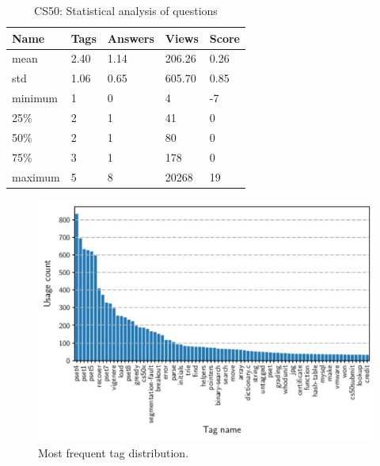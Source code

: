 \documentclass{sig-alternate}
\begin{document}
\begin{table}[]
\caption {CS50: Statistical analysis of questions
}
\hfill \break
\begin{center}
\begin{tabular}{|l|l|l|l|l|}
\hline
\textbf{Name} & \textbf{Tags} & \textbf{Answers} & \textbf{Views} & \textbf{Score} \\ \hline
mean          & 2.40          & 1.14             & 206.26         & 0.26           \\ \hline
std           & 1.06          & 0.65             & 605.70         & 0.85           \\ \hline
minimum       & 1             & 0                & 4              & -7             \\ \hline
25\%          & 2             & 1                & 41             & 0              \\ \hline
50\%          & 2             & 1                & 80             & 0              \\ \hline
75\%          & 3             & 1                & 178            & 0              \\ \hline
maximum       & 5             & 8                & 20268          & 19             \\ \hline
\end{tabular}
\end{center}
\end{table}

\begin{figure}
  \centering
    \includegraphics[width=\columnwidth]{graf01.JPG}
  \caption{Most frequent tag distribution.
}
  \label{fig:graph}
\end{figure}
\end{document}
